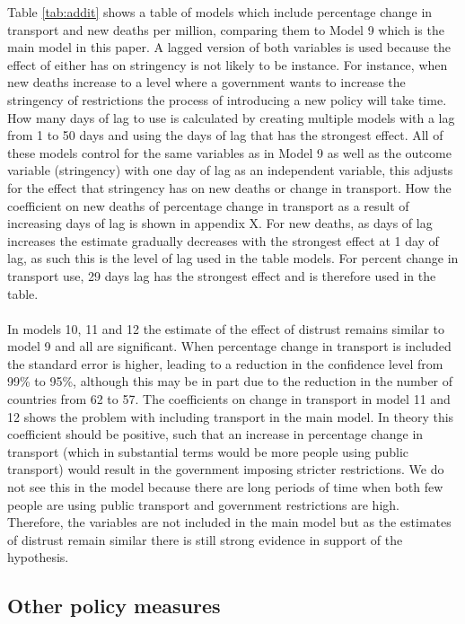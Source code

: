 \documentclass[
  11pt,
]{article}
\begin{document}
Table \ref{tab:addit} shows a table of models which include percentage change in transport and new deaths per million, comparing them to Model 9 which is the main model in this paper. A lagged version of both variables is used because the effect of either has on stringency is not likely to be instance. For instance, when new deaths increase to a level where a government wants to increase the stringency of restrictions the process of introducing a new policy will take time. How many days of lag to use is calculated by creating multiple models with a lag from 1 to 50 days and using the days of lag that has the strongest effect. All of these models control for the same variables as in Model 9 as well as the outcome variable (stringency) with one day of lag as an independent variable, this adjusts for the effect that stringency has on new deaths or change in transport. How the coefficient on new deaths of percentage change in transport as a result of increasing days of lag is shown in appendix X. For new deaths, as days of lag increases the estimate gradually decreases with the strongest effect at 1 day of lag, as such this is the level of lag used in the table models. For percent change in transport use, 29 days lag has the strongest effect and is therefore used in the table.\\
~\\
In models 10, 11 and 12 the estimate of the effect of distrust remains similar to model 9 and all are significant. When percentage change in transport is included the standard error is higher, leading to a reduction in the confidence level from 99\% to 95\%, although this may be in part due to the reduction in the number of countries from 62 to 57. The coefficients on change in transport in model 11 and 12 shows the problem with including transport in the main model. In theory this coefficient should be positive, such that an increase in percentage change in transport (which in substantial terms would be more people using public transport) would result in the government imposing stricter restrictions. We do not see this in the model because there are long periods of time when both few people are using public transport and government restrictions are high. Therefore, the variables are not included in the main model but as the estimates of distrust remain similar there is still strong evidence in support of the hypothesis.\\

\hypertarget{other-policy-measures}{%
\subsection{Other policy measures}\label{other-policy-measures}}
\end{document}
